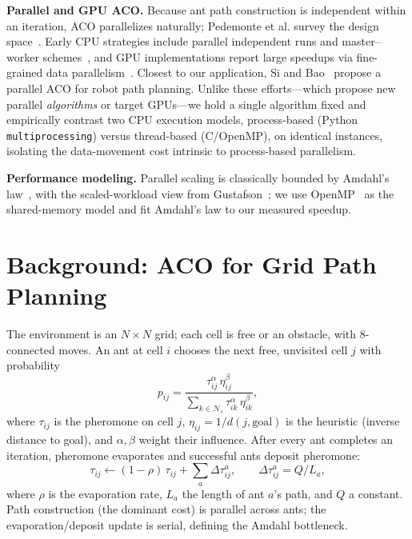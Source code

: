 \documentclass[conference]{IEEEtran}
\begin{document}
\textbf{Parallel and GPU ACO.} Because ant path construction is independent within
an iteration, ACO parallelizes naturally; Pedemonte et al. survey the design
space~\cite{pedemonte2011survey}. Early CPU strategies include parallel
independent runs and master--worker schemes~\cite{stutzle1998parallel,randall2002parallel},
and GPU implementations report large speedups via fine-grained data
parallelism~\cite{delevacq2013gpu,cecilia2013enhancing}. Closest to our
application, Si and Bao~\cite{si2024parallel} propose a parallel ACO for robot path
planning. Unlike these efforts---which propose new parallel \emph{algorithms} or
target GPUs---we hold a single algorithm fixed and empirically contrast two CPU
execution models, process-based (Python \texttt{multiprocessing}) versus
thread-based (C/OpenMP), on identical instances, isolating the data-movement cost
intrinsic to process-based parallelism.

\textbf{Performance modeling.} Parallel scaling is classically bounded by
Amdahl's law~\cite{amdahl1967}, with the scaled-workload view from
Gustafson~\cite{gustafson1988}; we use OpenMP~\cite{dagum1998openmp} as the
shared-memory model and fit Amdahl's law to our measured speedup.

\section{Background: ACO for Grid Path Planning}
The environment is an $N\times N$ grid; each cell is free or an obstacle, with
8-connected moves. An ant at cell $i$ chooses the next free, unvisited cell $j$
with probability
\begin{equation}
p_{ij} = \frac{\tau_{ij}^{\alpha}\,\eta_{ij}^{\beta}}
              {\sum_{k \in \mathcal{N}_i} \tau_{ik}^{\alpha}\,\eta_{ik}^{\beta}},
\end{equation}
where $\tau_{ij}$ is the pheromone on cell $j$, $\eta_{ij}=1/d(j,\text{goal})$ is
the heuristic (inverse distance to goal), and $\alpha,\beta$ weight their
influence. After every ant completes an iteration, pheromone evaporates and
successful ants deposit pheromone:
\begin{equation}
\tau_{ij} \leftarrow (1-\rho)\,\tau_{ij} + \sum_{a}\Delta\tau_{ij}^{a},
\qquad \Delta\tau_{ij}^{a} = Q/L_a,
\end{equation}
where $\rho$ is the evaporation rate, $L_a$ the length of ant $a$'s path, and $Q$
a constant. Path construction (the dominant cost) is parallel across ants; the
evaporation/deposit update is serial, defining the Amdahl bottleneck.
\end{document}
